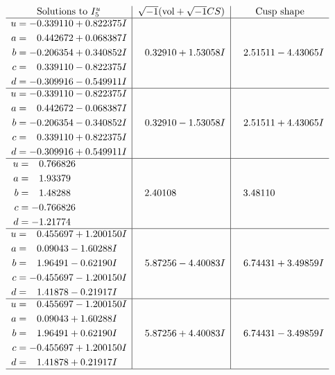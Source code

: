 \documentclass[1p]{elsarticle_modified}
\theoremstyle{definition}
\newcommand{\I}{\sqrt{-1}}
\begin{document}
$$\begin{array}{c|c|c}  
\text{Solutions to }I^u_{5}& \I (\text{vol} + \sqrt{-1}CS) & \text{Cusp shape}\\
 \hline 
\begin{aligned}
u &= -0.339110 + 0.822375 I \\
a &= \phantom{-}0.442672 + 0.068387 I \\
b &= -0.206354 + 0.340852 I \\
c &= \phantom{-}0.339110 - 0.822375 I \\
d &= -0.309916 - 0.549911 I\end{aligned}
 & \phantom{-}0.32910 + 1.53058 I & \phantom{-}2.51511 - 4.43065 I \\ \hline\begin{aligned}
u &= -0.339110 - 0.822375 I \\
a &= \phantom{-}0.442672 - 0.068387 I \\
b &= -0.206354 - 0.340852 I \\
c &= \phantom{-}0.339110 + 0.822375 I \\
d &= -0.309916 + 0.549911 I\end{aligned}
 & \phantom{-}0.32910 - 1.53058 I & \phantom{-}2.51511 + 4.43065 I \\ \hline\begin{aligned}
u &= \phantom{-}0.766826\phantom{ +0.000000I} \\
a &= \phantom{-}1.93379\phantom{ +0.000000I} \\
b &= \phantom{-}1.48288\phantom{ +0.000000I} \\
c &= -0.766826\phantom{ +0.000000I} \\
d &= -1.21774\phantom{ +0.000000I}\end{aligned}
 & \phantom{-}2.40108\phantom{ +0.000000I} & \phantom{-}3.48110\phantom{ +0.000000I} \\ \hline\begin{aligned}
u &= \phantom{-}0.455697 + 1.200150 I \\
a &= \phantom{-}0.09043 - 1.60288 I \\
b &= \phantom{-}1.96491 - 0.62190 I \\
c &= -0.455697 - 1.200150 I \\
d &= \phantom{-}1.41878 - 0.21917 I\end{aligned}
 & \phantom{-}5.87256 - 4.40083 I & \phantom{-}6.74431 + 3.49859 I \\ \hline\begin{aligned}
u &= \phantom{-}0.455697 - 1.200150 I \\
a &= \phantom{-}0.09043 + 1.60288 I \\
b &= \phantom{-}1.96491 + 0.62190 I \\
c &= -0.455697 + 1.200150 I \\
d &= \phantom{-}1.41878 + 0.21917 I\end{aligned}
 & \phantom{-}5.87256 + 4.40083 I & \phantom{-}6.74431 - 3.49859 I\\
 \hline 
 \end{array}$$\newpage\newpage\renewcommand{\arraystretch}{1}
\end{document}
